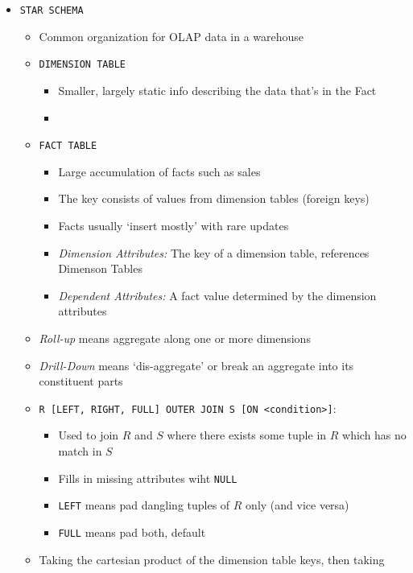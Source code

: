 \documentclass[landscape,8pt]{extarticle}
\newcommand{\code}{\lstinline}
\begin{document}
\begin{multicols}{4}
\begin{itemize}
\begin{itemize}
\begin{itemize}
        \end{itemize}
    \end{itemize}
    \item \code{STAR SCHEMA}
    \begin{itemize}
        \item Common organization for OLAP data in a warehouse
        \item \code{DIMENSION TABLE}
        \begin{itemize}
            \item Smaller, largely static info describing the data that's in the Fact
            \item 
        \end{itemize}
        \item \code{FACT TABLE}
        \begin{itemize}
            \item Large accumulation of facts such as sales
            \item The key consists of values from dimension tables (foreign keys)
            \item Facts usually `insert mostly' with rare updates
            \item \emph{Dimension Attributes:} The key of a dimension table, references Dimenson Tables
            \item \emph{Dependent Attributes:} A fact value determined by the dimension attributes
        \end{itemize}
        \item \emph{Roll-up} means aggregate along one or more dimensions
        \item \emph{Drill-Down} means `dis-aggregate' or break an aggregate into its constituent parts
    \item \code{R [LEFT, RIGHT, FULL] OUTER JOIN S [ON <condition>]}: 
    \begin{itemize}
        \item Used to join $R$ and $S$ where there exists some tuple in $R$ which has no match in
        $S$
        \item Fills in missing attributes wiht \code{NULL}
        \item \code{LEFT} means pad dangling tuples of $R$ only (and vice versa)
        \item \code{FULL} means pad both, default
    \end{itemize}
    \item Taking the cartesian product of the dimension table keys, then taking 

\end{itemize}
\end{itemize}
\end{multicols}
\end{document}
